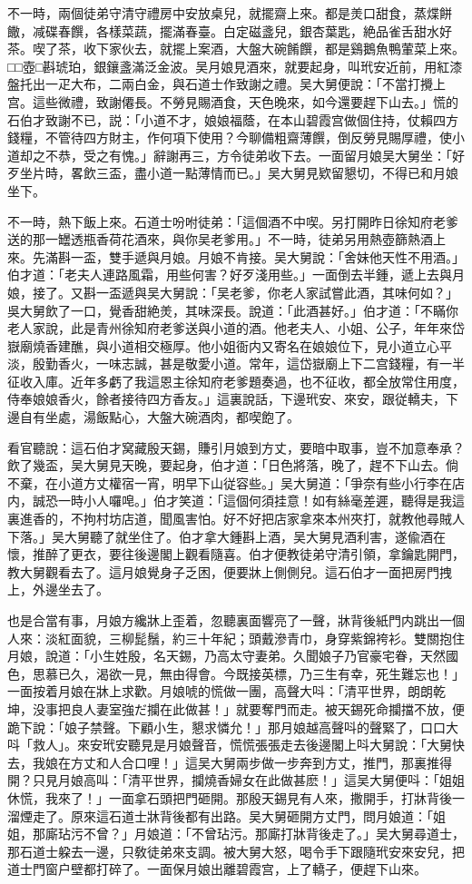 不一時，兩個徒弟守清守禮房中安放桌兒，就擺齋上來。都是羙口甜食，蒸煠餅饊，减碟春饌，各樣菜蔬，擺滿春臺。白定磁盞兒，銀杏葉匙，絶品雀舌甜水好茶。喫了茶，收下家伙去，就擺上案酒，大盤大碗餚饌，都是鷄鵝魚鴨葷菜上來。□□壺□斟琥珀，銀鑲盞滿泛金波。吴月娘見酒來，就要起身，叫玳安近前，用紅漆盤托出一疋大布，二兩白金，與石道士作致謝之禮。吴大舅便說：「不當打攪上宫。這些微禮，致謝僊長。不勞見賜酒食，天色晚來，如今還要趕下山去。」慌的石伯才致謝不已，説：「小道不才，娘娘福蔭，在本山碧霞宫做個住持，仗賴四方錢糧，不管待四方財主，作何項下使用？今聊備粗齋薄饌，倒反勞見賜厚禮，使小道却之不恭，受之有愧。」辭謝再三，方令徒弟收下去。一面留月娘吴大舅坐：「好歹坐片時，畧飲三盃，盡小道一點薄情而已。」吴大舅見欵留懇切，不得已和月娘坐下。

不一時，熱下飯上來。石道士吩咐徒弟：「這個酒不中喫。另打開昨日徐知府老爹送的那一罎透瓶香荷花酒來，與你吴老爹用。」不一時，徒弟另用熱壺篩熱酒上來。先滿斟一盃，雙手遞與月娘。月娘不肯接。吴大舅說：「舍妹他天性不用酒。」伯才道：「老夫人連路風霜，用些何害？好歹淺用些。」一面倒去半鍾，遞上去與月娘，接了。又斟一盃遞與吴大舅說：「吴老爹，你老人家試嘗此酒，其味何如？」吳大舅飲了一口，覺香甜絶羙，其味深長。說道：「此酒甚好。」伯才道：「不瞞你老人家說，此是青州徐知府老爹送與小道的酒。他老夫人、小姐、公子，年年來岱嶽廟燒香建醮，與小道相交極厚。他小姐衙内又寄名在娘娘位下，見小道立心平淡，殷勤香火，一味志誠，甚是敬愛小道。常年，這岱嶽廟上下二宫錢糧，有一半征收入庫。近年多虧了我這恩主徐知府老爹題奏過，也不征收，都全放常住用度，侍奉娘娘香火，餘者接待四方香友。」這裏說話，下邊玳安、來安，跟従轎夫，下邊自有坐處，湯飯點心，大盤大碗酒肉，都喫飽了。

看官聽說：這石伯才窝藏殷天錫，賺引月娘到方丈，要暗中取事，豈不加意奉承？飲了幾盃，吴大舅見天晚，要起身，伯才道：「日色將落，晚了，趕不下山去。倘不棄，在小道方丈權宿一宵，明早下山従容些。」吴大舅道：「爭奈有些小行李在店内，誠恐一時小人囉唣。」伯才笑道：「這個何須挂意！如有絲毫差遲，聽得是我這裏進香的，不拘村坊店道，聞風害怕。好不好把店家拿來本州夾打，就教他尋賊人下落。」吴大舅聽了就坐住了。伯才拿大鍾斟上酒，吴大舅見酒利害，遂偸酒在懷，推醉了更衣，要往後邊閣上觀看隨喜。伯才便教徒弟守清引領，拿鑰匙開門，教大舅觀看去了。這月娘覺身子乏困，便要牀上側側兒。這石伯才一面把房門拽上，外邊坐去了。

也是合當有事，月娘方纔牀上歪着，忽聽裏面響亮了一聲，牀背後紙門内跳出一個人來：淡紅面貌，三柳髭鬚，約三十年紀；頭戴滲青巾，身穿紫錦袴衫。雙關抱住月娘，說道：「小生姓殷，名天錫，乃高太守妻弟。久聞娘子乃官豪宅眷，天然國色，思慕已久，渴欲一見，無由得會。今既接英標，乃三生有幸，死生難忘也！」一面按着月娘在牀上求歡。月娘唬的慌做一團，高聲大呌：「清平世界，朗朗乾坤，没事把良人妻室強だ攔在此做甚！」就要奪門而走。被天錫死命攔擋不放，便跪下說：「娘子禁聲。下顧小生，懇求憐允！」那月娘越高聲呌的聲緊了，口口大呌「救人」。來安玳安聽見是月娘聲音，慌慌張張走去後邊閣上呌大舅說：「大舅快去，我娘在方丈和人合口哩！」這吴大舅兩步做一步奔到方丈，推門，那裏推得開？只見月娘高叫：「清平世界，攔燒香婦女在此做甚麽！」這吴大舅便呌：「姐姐休慌，我來了！」一面拿石頭把門砸開。那殷天錫見有人來，撒開手，打牀背後一溜煙走了。原來這石道士牀背後都有出路。吴大舅砸開方丈門，問月娘道：「姐姐，那廝玷污不曾？」月娘道：「不曾玷污。那廝打牀背後走了。」吴大舅尋道士，那石道士躱去一邊，只敎徒弟來支調。被大舅大怒，喝令手下跟隨玳安來安兒，把道士門窗户壁都打碎了。一面保月娘出離碧霞宫，上了轎子，便趕下山來。

